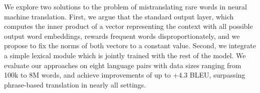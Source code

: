 We explore two solutions to the problem of mistranslating rare words in neural machine translation. First, we argue that the standard output layer, which computes the inner product of a vector representing the context with all possible output word embeddings, rewards frequent words disproportionately, and we propose to fix the norms of both vectors to a constant value. Second, we integrate a simple lexical module which is jointly trained with the rest of the model. We evaluate our approaches on eight language pairs with data sizes ranging from 100k to 8M words, and achieve improvements of up to +4.3 BLEU, surpassing phrase-based translation in nearly all settings.
